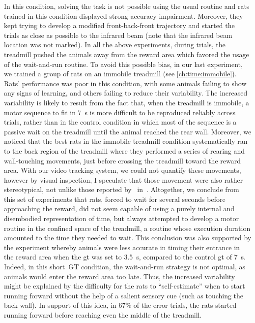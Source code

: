 In this condition, solving the task is not possible using the usual routine and rats trained in this condition displayed strong accuracy impairment.
Moreover, they kept trying to develop a modified front-back-front trajectory and started the trials as close as possible to the infrared beam (note that the infrared beam location was not marked).
In all the above experiments, during trials, the treadmill pushed the animals away from the reward area which favored the usage of the wait-and-run routine.
To avoid this possible bias, in our last experiment, we trained a group of rats on an immobile treadmill (see \autoref{ch:time:immobile}).
Rats' performance was poor in this condition, with some animals failing to show any signs of learning, and others failing to reduce their variability.
The increased variability is likely to result from the fact that, when the treadmill is immobile, a motor sequence to fit in 7~s is more difficult to be reproduced reliably across trials, rather than in the control condition in which most of the sequence is a passive wait on the treadmill until the animal reached the rear wall.
Moreover, we noticed that the best rats in the immobile treadmill condition systematically ran to the back region of the treadmill where they performed a series of rearing and wall-touching movements, just before crossing the treadmill toward the reward area.
With our video tracking system, we could not quantify these movements, however by visual inspection, I speculate that those movement were also rather stereotypical, not unlike those reported by~\citeauthor{Kawai2015} in~\cite{Kawai2015}.
Altogether, we conclude from this set of experiments that rats, forced to wait for several seconds before approaching the reward, did not seem capable of using a purely internal and disembodied representation of time, but always attempted to develop a motor routine in the confined space of the treadmill, a routine whose execution duration amounted to the time they needed to wait.
This conclusion was also supported by the experiment whereby animals were less accurate in timing their entrance in the reward area when the \gls{gt} was set to 3.5~s, compared to the control \gls{gt} of 7~s.
Indeed, in this short~GT condition, the wait-and-run strategy is not optimal, as animals would enter the reward area too late.
Thus, the increased variability might be explained by the difficulty for the rats to ``self-estimate'' when to start running forward without the help of a salient sensory cue (such as touching the back wall).
In support of this idea, in 67\% of the error trials, the rats started running forward before reaching even the middle of the treadmill.
